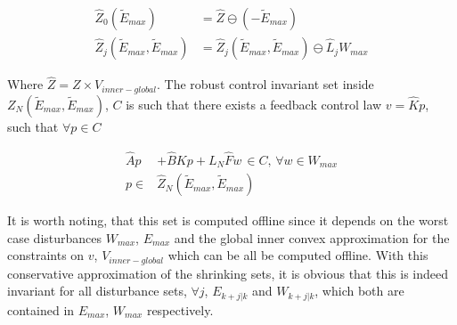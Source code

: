 \begin{subequations}
\begin{align}
\hat{Z}_0(\tilde{E}_{max}) &=\hat{Z}\ominus(-\tilde{E}_{max}) \\
\hat{Z}_j(\tilde{E}_{max},\tilde{E}_{max}) &= \hat{Z}_j(\tilde{E}_{max},\tilde{E}_{max})\ominus \hat{L}_{j}W_{max}
\end{align}
\end{subequations}

Where $\hat{Z}=Z\times V_{inner-global}$. The robust control invariant set inside $Z_N(\tilde{E}_{max},\tilde{E}_{max})$, $C$ is such that there exists a feedback control law $v=\hat{K}p$, such that $\forall p\in C$


\begin{subequations}
\begin{align}
\hat{A}p &+ \hat{B}Kp+L_N \hat{F}w \, \in C,\, \forall w \in W_{max} \\
p \in &\hat{Z}_N(\tilde{E}_{max}, \tilde{E}_{max})
\end{align}
\end{subequations}

It is worth noting, that this set is computed offline since it depends on the worst case disturbances $W_{max}$, $E_{max}$ and the global inner convex approximation for the constraints on $v$, $V_{inner-global}$ which can be all be computed offline. With this conservative approximation of the shrinking sets, it is obvious that this is indeed invariant for all disturbance sets, $\forall j$, $E_{k+j|k}$ and $W_{k+j|k}$, which both are contained in $E_{max}$, $W_{max}$ respectively. 


